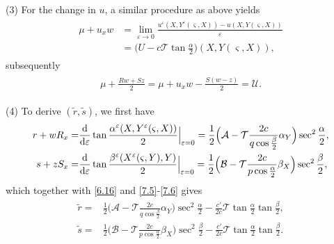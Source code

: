 \documentclass[11pt,reqno]{article}
\newcommand{\eps}{\varepsilon}
\newcommand{\fr}{\frac}
\numberwithin{equation}{section}
\begin{document}
(3) For the change in $u$, a similar procedure as above yields
\begin{align*}
\begin{split}
\mu +u_xw&=\lim_{\eps\rightarrow0} \fr{u^\eps(X,Y^\eps(\varsigma, X))-u(X,Y(\varsigma, X))}{\eps} \\
&=\Big(U-c\mathcal{T}\tan\fr{\alpha}{2}\Big)(X,Y(\varsigma, X)),
\end{split}
\end{align*}
subsequently
\begin{align}\label{7.7a}
\begin{split}
\mu+\fr{Rw+Sz}{2} =\mu+u_xw -\fr{S(w-z)}{2}= \mathcal{U}.
\end{split}
\end{align}

(4) To derive $(\tilde{r}, \tilde{s})$, we first have
\begin{align*}
\begin{split}
r+wR_x=&\fr{{\rm d}}{{\rm d}\eps}\tan\fr{\alpha^\eps(X,Y^\eps(\varsigma, X))}{2}\Big|_{\eps=0} =\fr{1}{2}\Big(\mathcal{A}-\mathcal{T}\fr{2c}{q\cos\fr{\beta}{2}}\alpha_Y\Big)\sec^2\fr{\alpha}{2}, \\
s+zS_x=&\fr{{\rm d}}{{\rm d}\eps}\tan\fr{\beta^\eps(X^\eps(\varsigma, Y),Y)}{2}\Big|_{\eps=0} =\fr{1}{2}\Big(\mathcal{B}-\mathcal{T}\fr{2c}{p\cos\fr{\alpha}{2}}\beta_X\Big)\sec^2\fr{\beta}{2},
\end{split}
\end{align*}
which together with \eqref{6.16} and \eqref{7.5}-\eqref{7.6} gives
\begin{align}\label{7.8}
\begin{split}
\tilde{r}=&\fr{1}{2} \Big(\mathcal{A}-\mathcal{T}\fr{2c}{q\cos\fr{\beta}{2}}\alpha_Y\Big)\sec^2\fr{\alpha}{2} -\fr{c'}{2c}\mathcal{T}\tan\fr{\alpha}{2}\tan\fr{\beta}{2}, \\
\tilde{s}=&\fr{1}{2} \Big(\mathcal{B}-\mathcal{T}\fr{2c}{p\cos\fr{\alpha}{2}}\beta_X\Big)\sec^2\fr{\beta}{2} -\fr{c'}{2c}\mathcal{T}\tan\fr{\alpha}{2}\tan\fr{\beta}{2}.
\end{split}
\end{align}
\end{document}
